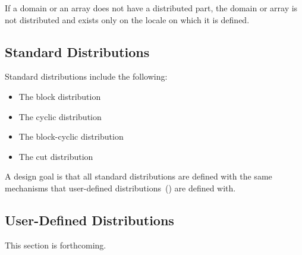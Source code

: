 If a domain or an array does not have a distributed part, the domain
or array is not distributed and exists only on the locale on which it
is defined.

\subsection{Standard Distributions}
\label{Standard_Distributions}

Standard distributions include the following:
\begin{itemize}
\item The block distribution 
\item The cyclic distribution 
\item The block-cyclic distribution 
\item The cut distribution 
\end{itemize}

A design goal is that all standard distributions are defined with the
same mechanisms that user-defined
distributions~() are defined with.

\subsection{User-Defined Distributions}
\label{User_Defined_Distributions}

This section is forthcoming.
